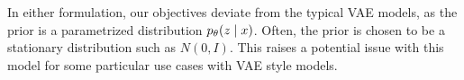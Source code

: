 










In either formulation, our objectives deviate from the typical VAE models, as the prior is a parametrized distribution $p_{\theta}(z \; | \;{x})$. Often, the prior is chosen to be a stationary distribution such as $N(0, I)$. This raises a potential issue with this model for some particular use cases with \ac{VAE} style models. 

